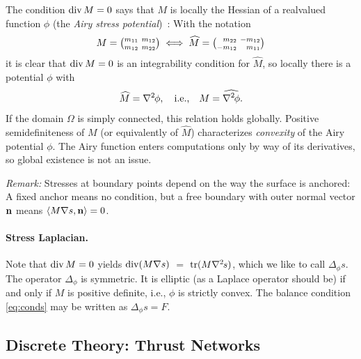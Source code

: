 \documentclass[annual]{acmsiggraph}
\def\<{\mathchoice{\big\langle}{\langle}{\langle}{\langle}}
\def\>{\mathchoice{\big\rangle}{\rangle}{\rangle}{\rangle}}
\def\wh{\widehat}
\def\Div{\mathop{{\rm div}}\nolimits}
\def\tr{\mathop{{\rm tr}}\nolimits}
\def\ess{s}
\def\Hess#1{{\def\testess{#1}\nabla^2\ifx\testess\ess\!s\else #1\fi}}
\def\Hess#1{\text{$\nabla^2\hskip-.2ex #1$}}
\begin{document}
The condition $\Div M=0$ says that $M$ is locally the Hessian of a
real\dash valued function $\phi$ (the {\em Airy stress potential})~\cite{green02}: With
the notation
	\begin{align*}
	M =
	{\textstyle {m_{11} \ m_{12} \choose m_{12} \ m_{22}}}
	\iff	
	\wh M =
	{\textstyle {\hphantom{-}m_{22} \ -m_{12} \choose -m_{12}
		 \ \hphantom{-}m_{11}}}
	\end{align*}
 it is clear that $\Div M=0$ is an integrability condition for $\wh M$, so
locally there is a potential $\phi$ with
	$$\wh M = \Hess\phi, \quad \text{i.e.,}\quad
	M = \wh{\Hess\phi}.$$
 If the domain $\Omega$ is simply connected, this relation holds globally.
Positive semidefiniteness of $M$ (or equivalently of $\wh M$)
characterizes {\em convexity} of the Airy potential $\phi$. The Airy
function enters computations only by way of its derivatives, so global
existence is not an issue.

{\it Remark:} Stresses at boundary points depend on the way the surface is
anchored: A fixed anchor means no condition, but a free boundary with
outer normal vector ${\mathbf n}$ means $\<M \nabla s, \nw \> = 0$.


\paragraph{Stress Laplacian.} Note that $\Div M =0$ yields $\Div(M\nabla
s)$ $ =$ $ \tr(M\Hess s)$, which we like to call $\Delta_\phi s$. The
operator $\Delta_\phi$ is symmetric. It is elliptic (as a Laplace operator
should be) if and only if $M$ is positive definite, i.e., $\phi$ is
strictly convex. The balance condition \eqref{eq:conds} may be written as
	$
	\Delta_\phi s = F.
	$


\subsection{Discrete Theory: Thrust Networks}
\label{sec:thrustnetworks}
\end{document}

